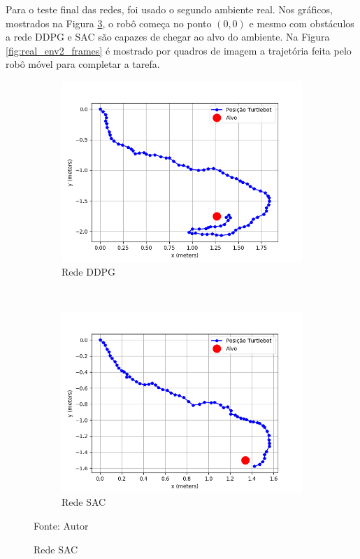 Para o teste final das redes, foi usado o segundo ambiente real. Nos gráficos, mostrados na Figura \ref{fig:real_env2}, o robô começa no ponto $(0,0)$ e mesmo com obstáculos a rede DDPG e SAC são capazes de chegar ao alvo do ambiente.
Na Figura \ref{fig:real_env2_frames} é mostrado por quadros de imagem a trajetória feita pelo robô móvel para completar a tarefa.

\vspace{0.25cm} 
\begin{figure}[H]
\caption{Trajetória do Turtlebot3 no segundo ambiente real}
    \begin{center}
    \begin{subfigure}[b]{0.48\textwidth}
        \includegraphics[width=\textwidth]{imagens/real_envs/real_env2_ddpg/graph.png}
        \caption{Rede DDPG}
        \label{subfig:ddpg_real_env2}
    \end{subfigure}
    ~
    \begin{subfigure}[b]{0.48\textwidth}
        \includegraphics[width=\textwidth]{imagens/real_envs/real_env2_sac/graph.png}
        \caption{Rede SAC}
        \label{subfig:sac_real_env2}
    \end{subfigure}
    \end{center}
    \label{fig:real_env2}
\small{Fonte: Autor}
\end{figure}

